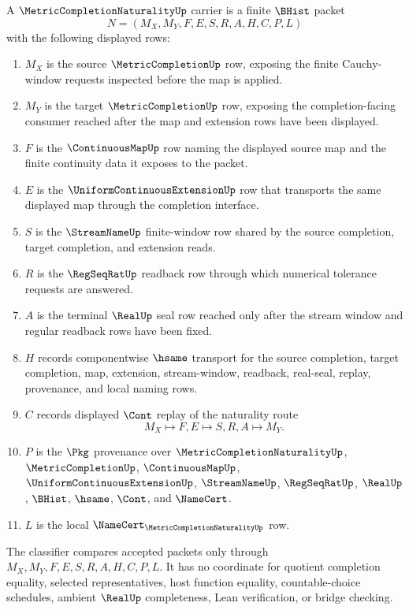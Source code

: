 \begin{definition}
\label{def:metric-completion-naturality-carrier}
A $\MetricCompletionNaturalityUp$ carrier is a finite $\BHist$ packet
$$
N=(M_X,M_Y,F,E,S,R,A,H,C,P,L)
$$
with the following displayed rows:
\begin{enumerate}
\item $M_X$ is the source $\MetricCompletionUp$ row, exposing the finite Cauchy-window requests inspected before the map is applied.
\item $M_Y$ is the target $\MetricCompletionUp$ row, exposing the completion-facing consumer reached after the map and extension rows have been displayed.
\item $F$ is the $\ContinuousMapUp$ row naming the displayed source map and the finite continuity data it exposes to the packet.
\item $E$ is the $\UniformContinuousExtensionUp$ row that transports the same displayed map through the completion interface.
\item $S$ is the $\StreamNameUp$ finite-window row shared by the source completion, target completion, and extension reads.
\item $R$ is the $\RegSeqRatUp$ readback row through which numerical tolerance requests are answered.
\item $A$ is the terminal $\RealUp$ seal row reached only after the stream window and regular readback rows have been fixed.
\item $H$ records componentwise $\hsame$ transport for the source completion, target completion, map, extension, stream-window, readback, real-seal, replay, provenance, and local naming rows.
\item $C$ records displayed $\Cont$ replay of the naturality route
$$
M_X \longmapsto F,E \longmapsto S,R,A \longmapsto M_Y .
$$
\item $P$ is the $\Pkg$ provenance over $\MetricCompletionNaturalityUp$, $\MetricCompletionUp$, $\ContinuousMapUp$, $\UniformContinuousExtensionUp$, $\StreamNameUp$, $\RegSeqRatUp$, $\RealUp$, $\BHist$, $\hsame$, $\Cont$, and $\NameCert$.
\item $L$ is the local $\NameCert_{\MetricCompletionNaturalityUp}$ row.
\end{enumerate}
The classifier compares accepted packets only through $M_X,M_Y,F,E,S,R,A,H,C,P,L$. It has no coordinate for quotient completion equality, selected representatives, host function equality, countable-choice schedules, ambient $\RealUp$ completeness, Lean verification, or bridge checking.
\end{definition}

